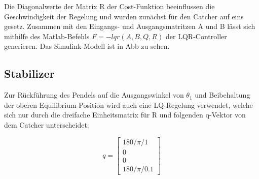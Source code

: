 Die Diagonalwerte der Matrix R der Cost-Funktion beeinflussen die Geschwindigkeit der Regelung und wurden zunächst für den Catcher auf eins gesetz.
Zusammen mit den Eingangs- und Ausgangsmatritzen A und B lässt sich mithilfe des Matlab-Befehls $F = -lqr(A,B,Q,R)$ der LQR-Controller generieren.
Das Simulink-Modell ist in Abb zu sehen.


\subsection{Stabilizer}
\label{stabilizer} 

Zur Rückführung des Pendels auf die Ausgangswinkel von $\theta_1$ und Beibehaltung der oberen Equilibrium-Position wird auch eine LQ-Regelung verwendet, welche sich nur durch die dreifache Einheitsmatrix für R und folgenden q-Vektor von dem Catcher unterscheidet:

\begin{equation}
q =\begin{bmatrix}
         180/\pi/1 \\
         0\\
         0\\
         180/\pi/0.1
        \end{bmatrix}
\end{equation}


